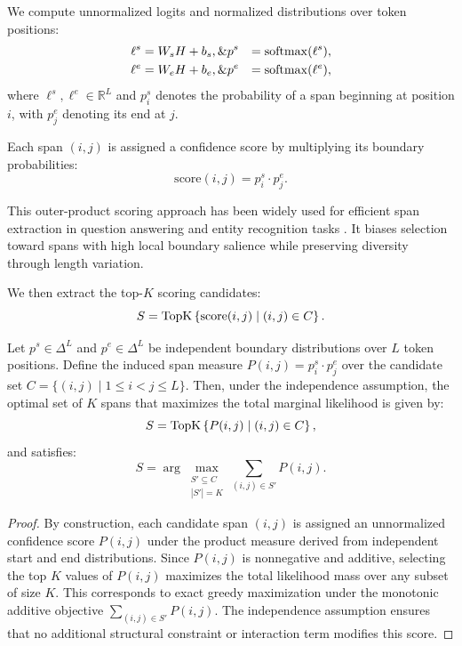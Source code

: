 We compute unnormalized logits and normalized distributions over token positions:
\begin{align*}
  \ell^s &= W_s H + b_s, \& p^s &= \mathrm{softmax}(\ell^s), \\
  \ell^e &= W_e H + b_e, \& p^e &= \mathrm{softmax}(\ell^e),
\end{align*}
where \(\ell^s, \ell^e \in \mathbb{R}^{L}\) and \(p^s_i\) denotes the probability of a span beginning at position \(i\), with \(p^e_j\) denoting its end at \(j\).

Each span \((i,j)\) is assigned a confidence score by multiplying its boundary probabilities:
\[
  \mathrm{score}(i,j) = p^s_i \cdot p^e_j.
\]

This outer-product scoring approach has been widely used for efficient span extraction in question answering and entity recognition tasks \cite{lee2016learning, xu2022faster}. It biases selection toward spans with high local boundary salience while preserving diversity through length variation.

We then extract the top-\(K\) scoring candidates:
\[
  S = \operatorname{TopK}\left\{ \mathrm{score}(i,j) \mid (i,j) \in C \right\}.
\]

\begin{proposition}
Let \( p^s \in \Delta^L \) and \( p^e \in \Delta^L \) be independent boundary distributions over \(L\) token positions. Define the induced span measure \( P(i,j) = p^s_i \cdot p^e_j \) over the candidate set \( C = \{(i,j) \mid 1 \le i < j \le L\} \). Then, under the independence assumption, the optimal set of \(K\) spans that maximizes the total marginal likelihood is given by:
\[
S = \operatorname{TopK} \left\{ P(i,j) \;\middle|\; (i,j) \in C \right\},
\]
and satisfies:
\[
S = \arg\max_{\substack{S' \subseteq C \\ |S'| = K}} \sum_{(i,j) \in S'} P(i,j).
\]
\end{proposition}

\begin{proof}
By construction, each candidate span \((i,j)\) is assigned an unnormalized confidence score \(P(i,j)\) under the product measure derived from independent start and end distributions. Since \(P(i,j)\) is nonnegative and additive, selecting the top \(K\) values of \(P(i,j)\) maximizes the total likelihood mass over any subset of size \(K\). This corresponds to exact greedy maximization under the monotonic additive objective \( \sum_{(i,j) \in S'} P(i,j) \). The independence assumption ensures that no additional structural constraint or interaction term modifies this score.
\end{proof}

